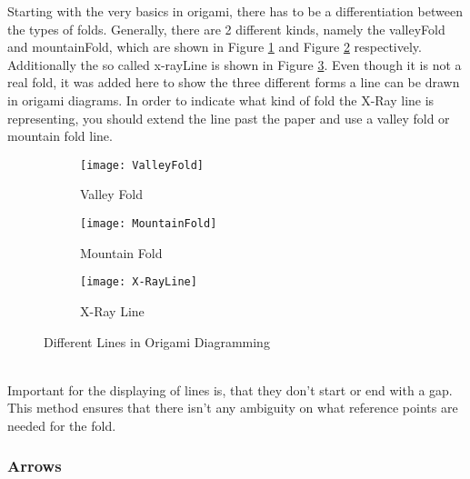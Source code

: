 Starting with the very basics in origami, there has to be a differentiation between the types of folds. Generally, there are 2 different kinds, namely the \gls{valleyFold} and \gls{mountainFold}, which are shown in Figure \ref{fig:valleyFold} and Figure \ref{fig:mountainFold} respectively. Additionally the so called \gls{x-rayLine} is shown in Figure \ref{fig:x-rayLine}. Even though it is not a real fold, it was added here to show the three different forms a line can be drawn in origami diagrams. In order to indicate what kind of fold the X-Ray line is representing, you should extend the line past the paper and use a valley fold or mountain fold line.
\begin{figure*}[htbp]
    \centering
    \begin{subfigure}{0.3\textwidth}
        \texttt{[image: ValleyFold]}
        \caption{Valley Fold}
        \label{fig:valleyFold}
    \end{subfigure}
    \begin{subfigure}{0.3\textwidth}
        \texttt{[image: MountainFold]}
        \caption{Mountain Fold}
        \label{fig:mountainFold}
    \end{subfigure}
    \begin{subfigure}{0.3\textwidth}
        \texttt{[image: X-RayLine]}
        \caption{X-Ray Line}
        \label{fig:x-rayLine}
    \end{subfigure}
    \caption{Different Lines in Origami Diagramming}\label{fig:origamiLines}
\end{figure*}
\\
Important for the displaying of lines is, that they don't start or end with a gap. This method ensures that there isn't any ambiguity on what reference points are needed for the fold.

\newpage
\subsubsection{Arrows}
\label{sec:arrows}

